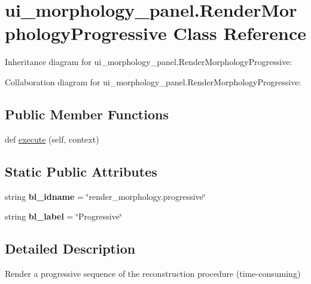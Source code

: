 \hypertarget{classui__morphology__panel_1_1RenderMorphologyProgressive}{}\section{ui\+\_\+morphology\+\_\+panel.\+Render\+Morphology\+Progressive Class Reference}
\label{classui__morphology__panel_1_1RenderMorphologyProgressive}


Inheritance diagram for ui\+\_\+morphology\+\_\+panel.\+Render\+Morphology\+Progressive\+:


Collaboration diagram for ui\+\_\+morphology\+\_\+panel.\+Render\+Morphology\+Progressive\+:
\subsection*{Public Member Functions}
\begin{DoxyCompactItemize}
\item 
def \hyperlink{classui__morphology__panel_1_1RenderMorphologyProgressive_a37d82d0599165a7ff62f69ac9543de75}{execute} (self, context)
\end{DoxyCompactItemize}
\subsection*{Static Public Attributes}
\begin{DoxyCompactItemize}
\item 
string {\bfseries bl\+\_\+idname} = \char`\"{}render\+\_\+morphology.\+progressive\char`\"{}\hypertarget{classui__morphology__panel_1_1RenderMorphologyProgressive_a73997046f6372e88ee66b16ab116df02}{}\label{classui__morphology__panel_1_1RenderMorphologyProgressive_a73997046f6372e88ee66b16ab116df02}

\item 
string {\bfseries bl\+\_\+label} = \char`\"{}Progressive\char`\"{}\hypertarget{classui__morphology__panel_1_1RenderMorphologyProgressive_af16eff3bec33e889af9a327ebd968eec}{}\label{classui__morphology__panel_1_1RenderMorphologyProgressive_af16eff3bec33e889af9a327ebd968eec}

\end{DoxyCompactItemize}


\subsection{Detailed Description}
\begin{DoxyVerb}Render a progressive sequence of the reconstruction procedure (time-consuming)\end{DoxyVerb}
 

